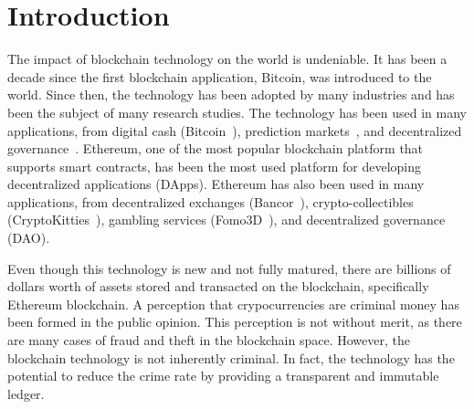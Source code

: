 






\chapter{Introduction} \label{sec:intro}

The impact of blockchain technology on the world is undeniable. It has been a decade since the first blockchain application, Bitcoin, was introduced to the world. Since then, the technology has been adopted by many industries and has been the subject of many research studies. The technology has been used in many applications, from digital cash (\eg Bitcoin~\cite{nakamoto2008bitcoin}), prediction markets~\cite{clark2014decentralizing}, and decentralized governance~\cite{aragonwebsite}. Ethereum, one of the most popular blockchain platform that supports smart contracts, has been the most used platform for developing decentralized applications (DApps). Ethereum has also been used in many applications, from decentralized exchanges (\eg Bancor~\cite{hertzog2017bancor}), crypto-collectibles (\eg CryptoKitties~\cite{cryptokitties}), gambling services (\eg Fomo3D~\cite{fomo3dmedium}), and decentralized governance (\eg DAO).

Even though this technology is new and not fully matured, there are billions of dollars worth of assets stored and transacted on the blockchain, specifically Ethereum blockchain. A perception that crypocurrencies are criminal money has been formed in the public opinion. This perception is not without merit, as there are many cases of fraud and theft in the blockchain space. However, the blockchain technology is not inherently criminal. In fact, the technology has the potential to reduce the crime rate by providing a transparent and immutable ledger.

